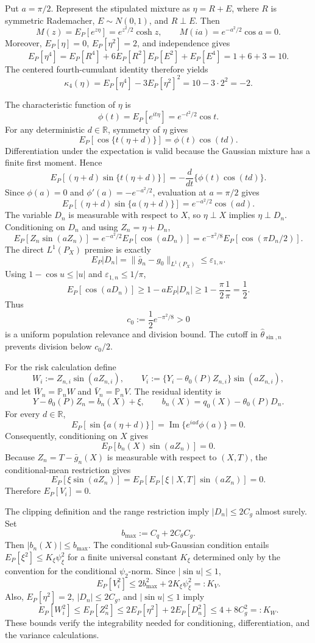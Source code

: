 Put \(a=\pi/2\). Represent the stipulated mixture as \(\eta=R+E\), where \(R\) is symmetric Rademacher, \(E\sim N(0,1)\), and \(R\perp E\). Then
\[
M(z)=E_P[e^{z\eta}]=e^{z^2/2}\cosh z,
\qquad
M(ia)=e^{-a^2/2}\cos a=0.
\]
Moreover, \(E_P[\eta]=0\), \(E_P[\eta^2]=2\), and independence gives
\[
E_P[\eta^4]
=E_P[R^4]+6E_P[R^2]E_P[E^2]+E_P[E^4]
=1+6+3=10.
\]
The centered fourth-cumulant identity therefore yields
\[
\kappa_4(\eta)=E_P[\eta^4]-3E_P[\eta^2]^2=10-3\cdot2^2=-2.
\]

The characteristic function of \(\eta\) is
\[
\phi(t)=E_P[e^{it\eta}]=e^{-t^2/2}\cos t.
\]
For any deterministic \(d\in\mathbb R\), symmetry of \(\eta\) gives
\[
E_P[\cos\{t(\eta+d)\}]=\phi(t)\cos(td).
\]
Differentiation under the expectation is valid because the Gaussian mixture has a finite first moment. Hence
\[
E_P[(\eta+d)\sin\{t(\eta+d)\}]
=-\frac{d}{dt}\{\phi(t)\cos(td)\}.
\]
Since \(\phi(a)=0\) and \(\phi'(a)=-e^{-a^2/2}\), evaluation at \(a=\pi/2\) gives
\[
E_P[(\eta+d)\sin\{a(\eta+d)\}]
=e^{-a^2/2}\cos(ad).
\]
The variable \(D_n\) is measurable with respect to \(X\), so \(\eta\perp X\) implies \(\eta\perp D_n\). Conditioning on \(D_n\) and using \(Z_n=\eta+D_n\),
\[
E_P[Z_n\sin(aZ_n)]
=e^{-a^2/2}E_P[\cos(aD_n)]
=e^{-\pi^2/8}E_P[\cos(\pi D_n/2)].
\]
The direct \(L^1(P_X)\) premise is exactly
\[
E_P|D_n|=\|\bar g_n-g_0\|_{L^1(P_X)}\le\varepsilon_{1,n}.
\]
Using \(1-\cos u\le |u|\) and \(\varepsilon_{1,n}\le1/\pi\),
\[
E_P[\cos(aD_n)]
\ge1-aE_P|D_n|
\ge1-\frac{\pi}{2}\frac1\pi
=\frac12.
\]
Thus
\[
c_0:=\frac12e^{-\pi^2/8}>0
\]
is a uniform population relevance and division bound. The cutoff in \(\widehat\theta_{\sin,n}\) prevents division below \(c_0/2\).

For the risk calculation define
\[
W_i:=Z_{n,i}\sin(aZ_{n,i}),
\qquad
V_i:=\{Y_i-\theta_0(P)Z_{n,i}\}\sin(aZ_{n,i}),
\]
and let \(\bar W_n=\mathbb P_nW\) and \(\bar V_n=\mathbb P_nV\). The residual identity is
\[
Y-\theta_0(P)Z_n=b_n(X)+\xi,
\qquad
b_n(X)=q_0(X)-\theta_0(P)D_n.
\]
For every \(d\in\mathbb R\),
\[
E_P[\sin\{a(\eta+d)\}]
=\operatorname{Im}\{e^{iad}\phi(a)\}=0.
\]
Consequently, conditioning on \(X\) gives
\[
E_P[b_n(X)\sin(aZ_n)]=0.
\]
Because \(Z_n=T-\bar g_n(X)\) is measurable with respect to \((X,T)\), the conditional-mean restriction gives
\[
E_P[\xi\sin(aZ_n)]
=E_P\!\left[E_P[\xi\mid X,T]\sin(aZ_n)\right]=0.
\]
Therefore \(E_P[V_i]=0\).

The clipping definition and the range restriction imply \(|D_n|\le2C_g\) almost surely. Set
\[
b_{\max}:=C_q+2C_{\theta}C_g.
\]
Then \(|b_n(X)|\le b_{\max}\). The conditional sub-Gaussian condition entails \(E_P[\xi^2]\le K_{\xi}\psi_{\xi}^2\) for a finite universal constant \(K_{\xi}\) determined only by the convention for the conditional \(\psi_2\)-norm. Since \(|\sin u|\le1\),
\[
E_P[V_i^2]
\le2b_{\max}^2+2K_{\xi}\psi_{\xi}^2
=:K_V.
\]
Also, \(E_P[\eta^2]=2\), \(|D_n|\le2C_g\), and \(|\sin u|\le1\) imply
\[
E_P[W_i^2]
\le E_P[Z_n^2]
\le2E_P[\eta^2]+2E_P[D_n^2]
\le4+8C_g^2
=:K_W.
\]
These bounds verify the integrability needed for conditioning, differentiation, and the variance calculations.

